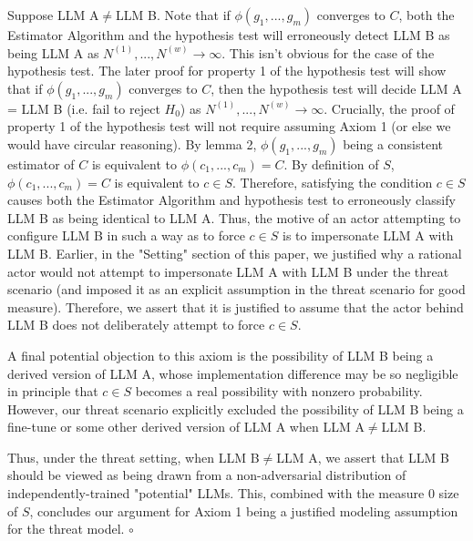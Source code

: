 \documentclass{article}
\begin{document}
Suppose LLM A$\displaystyle \neq $LLM B. Note that if $\displaystyle \phi \left( g_{1} ,...,g_{m}\right)$ converges to $\displaystyle C$, both the Estimator Algorithm and the hypothesis test will erroneously detect LLM B as being LLM A as $\displaystyle N^{\left( 1\right)} ,...,N^{\left( w\right)}\rightarrow \infty $. This isn't obvious for the case of the hypothesis test. The later proof for property 1 of the hypothesis test will show that if $\displaystyle \phi \left( g_{1} ,...,g_{m}\right)$ converges to $\displaystyle C$, then the hypothesis test will decide LLM A = LLM B (i.e. fail to reject $\displaystyle H_{0}$) as $\displaystyle N^{\left( 1\right)} ,...,N^{\left( w\right)}\rightarrow \infty $. Crucially, the proof of property 1 of the hypothesis test will not require assuming Axiom 1 (or else we would have circular reasoning). By lemma 2, $\displaystyle \phi \left( g_{1} ,...,g_{m}\right)$ being a consistent estimator of $\displaystyle C$ is equivalent to $\displaystyle \phi \left( c_{1} ,...,c_{m}\right) =C$. By definition of $\displaystyle S$, $\displaystyle \phi \left( c_{1} ,...,c_{m}\right) =C$ is equivalent to $\displaystyle c\in S$. Therefore, satisfying the condition $\displaystyle c\in S$ causes both the Estimator Algorithm and hypothesis test to erroneously classify LLM B as being identical to LLM A. Thus, the motive of an actor attempting to configure LLM B in such a way as to force $\displaystyle c\in S$ is to impersonate LLM A with LLM B. Earlier, in the "Setting" section of this paper, we justified why a rational actor would not attempt to impersonate LLM A with LLM B under the threat scenario (and imposed it as an explicit assumption in the threat scenario for good measure). Therefore, we assert that it is justified to assume that the actor behind LLM B does not deliberately attempt to force $\displaystyle c\in S$. 



A final potential objection to this axiom is the possibility of LLM B being a derived version of LLM A, whose implementation difference may be so negligible in principle that $\displaystyle c\in S$ becomes a real possibility with nonzero probability. However, our threat scenario explicitly excluded the possibility of LLM B being a fine-tune or some other derived version of LLM A when LLM A$\displaystyle \neq $LLM B.



Thus, under the threat setting, when LLM B$\displaystyle \neq $LLM A, we assert that LLM B should be viewed as being drawn from a non-adversarial distribution of independently-trained "potential" LLMs. This, combined with the measure 0 size of $\displaystyle S$, concludes our argument for Axiom 1 being a justified modeling assumption for the threat model. \(\circ\)
\end{document}
